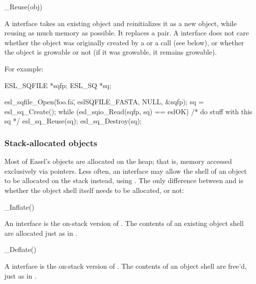 \begin{sreapi}
\hypertarget{ifc:Reuse}
{\item[\_Reuse(obj)]}

A  interface takes an existing object and
reinitializes it as a new object, while reusing as much memory as
possible. It replaces a  pair. A
 interface does not care whether the object was
originally created by a  or a 
call (see below), or whether the object is growable or not (if it was
growable, it remains growable).
\end{sreapi}

For example:

\begin{cchunk}
   ESL_SQFILE *sqfp;
   ESL_SQ     *sq;

   esl_sqfile_Open(\"foo.fa\", eslSQFILE_FASTA, NULL, &sqfp);
   sq = esl_sq_Create();
   while (esl_sqio_Read(sqfp, sq) == eslOK)
    {
       /* do stuff with this sq */
       esl_sq_Reuse(sq);
    }
   esl_sq_Destroy(sq);
\end{cchunk}


\subsubsection{Stack-allocated objects}

Most of Easel's objects are allocated on the heap; that is,
 memory accessed exclusively via pointers. Less
often, an interface may allow the shell of an object to be allocated
on the stack instead, using .  The only
difference between  and
 is whether the object shell itself
needs to be allocated, or not:

\begin{sreapi}
\hypertarget{ifc:Inflate}
{\item[\_Inflate()]}

An  interface is the on-stack version of
. The contents of an existing object shell
are allocated just as in .

\hypertarget{ifc:Deflate}
{\item[\_Deflate()]}

A  interface is the on-stack version of
. The contents of an object shell are free'd,
just as in .
\end{sreapi}

